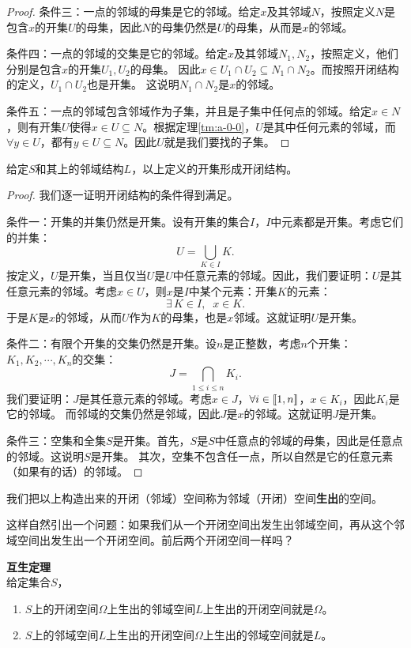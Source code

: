 \documentclass[12pt,UTF8,fontset=none]{ctexbook}
\begin{document}
\begin{appendix}
\begin{proof}
    条件三：一点的邻域的母集是它的邻域。给定$x$及其邻域$N$，按照定义$N$是包含$x$的开集$U$的母集，因此$N$的母集仍然是$U$的母集，从而是$x$的邻域。

    条件四：一点的邻域的交集是它的邻域。给定$x$及其邻域$N_1, N_2$，按照定义，他们分别是包含$x$的开集$U_1, U_2$的母集。
    因此$x\in U_1\cap U_2 \subseteq N_1\cap N_2 $。而按照开闭结构的定义，$U_1\cap  U_2$也是开集。
    这说明$N_1\cap N_2$是$x$的邻域。

    条件五：一点的邻域包含邻域作为子集，并且是子集中任何点的邻域。给定$x\in N$，则有开集$U$使得$x\in U \subseteq N$。根据定理\ref{tm:a-0-0}，$U$是其中任何元素的邻域，而$\forall y \in U$，都有$y\in U \subseteq N$。因此$U$就是我们要找的子集。
\end{proof}

\begin{tm}
    给定$S$和其上的邻域结构$L$，以上定义的开集形成开闭结构。
\end{tm}

\begin{proof}
    我们逐一证明开闭结构的条件得到满足。

    条件一：开集的并集仍然是开集。设有开集的集合$I$，$I$中元素都是开集。考虑它们的并集：
    $$ U = \bigcup_{K\in I} K. $$
    按定义，$U$是开集，当且仅当$U$是$U$中任意元素的邻域。因此，我们要证明：$U$是其任意元素的邻域。考虑$x\in U$，则$x$是$I$中某个元素：开集$K$的元素：
    $$ \exists \, K \in I, \;\; x \in K.$$
    于是$K$是$x$的邻域，从而$U$作为$K$的母集，也是$x$邻域。这就证明$U$是开集。

    条件二：有限个开集的交集仍然是开集。设$n$是正整数，考虑$n$个开集：$K_1, K_2, \cdots, K_n$的交集：
    $$ J = \bigcap_{1\leqslant i \leqslant n} K_i.$$
    我们要证明：$J$是其任意元素的邻域。考虑$x\in J$，$\forall i\in[\![1,n]\!]$，$x\in K_i$，因此$K_i$是它的邻域。
    而邻域的交集仍然是邻域，因此$J$是$x$的邻域。这就证明$J$是开集。

    条件三：空集和全集$S$是开集。首先，$S$是$S$中任意点的邻域的母集，因此是任意点的邻域。这说明$S$是开集。
    其次，空集不包含任一点，所以自然是它的任意元素（如果有的话）的邻域。

\end{proof}

我们把以上构造出来的开闭（邻域）空间称为邻域（开闭）空间\textbf{生出}的空间。

这样自然引出一个问题：如果我们从一个开闭空间出发生出邻域空间，再从这个邻域空间出发生出一个开闭空间。前后两个开闭空间一样吗？

\begin{tm}{\textbf{互生定理}}
    \mbox{} \\
    给定集合$S$，
    \begin{enumerate}
        \item $S$上的开闭空间$\Omega$上生出的邻域空间$L$上生出的开闭空间就是$\Omega$。
        \item $S$上的邻域空间$L$上生出的开闭空间$\Omega$上生出的邻域空间就是$L$。
    \end{enumerate}
\end{tm}


\end{appendix}
\end{document}
